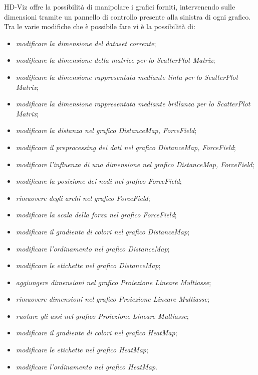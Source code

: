\documentclass[../manuale_utente.tex]{subfiles}
\begin{document}
HD-Viz offre la possibilità di manipolare i grafici forniti, intervenendo sulle dimensioni tramite un pannello di controllo presente alla sinistra di ogni grafico. 
Tra le varie modifiche che è possibile fare vi è la possibilità di: 
\begin{itemize}
	\item \emph{modificare la dimensione del dataset corrente};
	\item \emph{modificare la dimensione della matrice per lo ScatterPlot Matrix};
	\item \emph{modificare la dimensione rappresentata mediante tinta per lo ScatterPlot Matrix};
	\item \emph{modificare la dimensione rappresentata mediante brillanza per lo ScatterPlot Matrix};
	\item \emph{modificare la distanza nel grafico DistanceMap, ForceField};
	\item \emph{modificare il preprocessing dei dati nel grafico DistanceMap, ForceField};
	\item \emph{modificare l’influenza di una dimensione nel grafico DistanceMap, ForceField};
	\item \emph{modificare la posizione dei nodi nel grafico ForceField};
	\item \emph{rimuovere degli archi nel grafico ForceField};
	\item \emph{modificare la scala della forza nel grafico ForceField};
	\item \emph{modificare il gradiente di colori nel grafico DistanceMap};
	\item \emph{modificare l’ordinamento nel grafico DistanceMap};
	\item \emph{modificare le etichette nel grafico DistanceMap};
	\item \emph{aggiungere dimensioni nel grafico Proiezione Lineare Multiasse};
	\item \emph{rimuovere dimensioni nel grafico Proiezione Lineare Multiasse};
	\item \emph{ruotare gli assi nel grafico Proiezione Lineare Multiasse};
	\item \emph{modificare il gradiente di colori nel grafico HeatMap};
	\item \emph{modificare le etichette nel grafico HeatMap};
	\item \emph{modificare l’ordinamento nel grafico HeatMap}.
\end{itemize}
\end{document}
